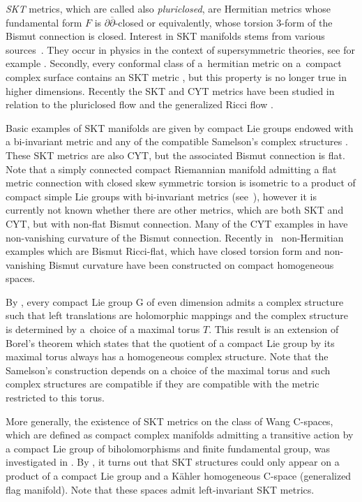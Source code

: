 \documentclass[pdftex]{sigma}
\numberwithin{equation}{section}
\begin{document}
{\em SKT} metrics, which are called also {\em pluriclosed}, are Hermitian metrics whose fundamental form $F$ is $\partial \overline \partial$-closed or equivalently, whose torsion $3$-form of the Bismut connection is closed. Interest in SKT manifolds stems from various sources~\cite{Swann}. They occur in physics in the context of supersymmetric theories, see for example \cite{GHR,HP,Strominger}. Secondly, every conformal class of a~hermitian metric on a~compact complex surface contains an SKT metric \cite{Gau}, but this property is no longer true in higher dimensions. Recently the SKT and CYT metrics have been studied in relation to the pluriclosed flow and the generalized Ricci flow \cite{AFSU, Barbaro, GJS, GS}.

Basic examples of SKT manifolds are given by compact Lie groups endowed with a bi-invariant metric and any of the compatible Samelson’s complex structures \cite{Samelson}. These SKT metrics are also CYT, but the associated Bismut connection is flat. Note that a simply connected compact Riemannian manifold admitting a flat metric connection with closed skew symmetric torsion is isometric to a product of compact simple Lie groups with bi-invariant metrics (see~\cite[Theorem~3.54]{GS}),
however it is currently not known whether there are other metrics, which are both SKT and CYT, but with non-flat Bismut connection. Many of the CYT examples in \cite{Grantcharov} have non-vanishing curvature of the Bismut connection. Recently in~\cite{PR, PR2} non-Hermitian examples which are Bismut Ricci-flat, which have closed torsion form and non-vanishing Bismut curvature have been constructed on compact homogeneous spaces.

By \cite{Samelson}, every compact Lie group G of even dimension admits a complex structure such that left translations are holomorphic mappings and the complex structure is determined by a~choice of a maximal torus $T$. This result is an extension of Borel's theorem which states that the quotient of a compact Lie group by its maximal torus always has a homogeneous complex structure.
Note that the Samelson’s construction depends on a choice of the maximal torus and such complex structures are compatible if they are compatible with the metric restricted to this torus.

More generally, the existence of SKT metrics on the class of Wang C-spaces, which are defined as compact complex manifolds admitting a transitive action by a compact Lie group of biholomorphisms and finite fundamental group, was investigated in \cite{FGV}. By \cite{FGV}, it turns out that SKT structures could only appear on a product of a compact Lie group and a K\"ahler homogeneous C-space (generalized flag manifold). Note that these spaces admit left-invariant SKT metrics.
\end{document}
